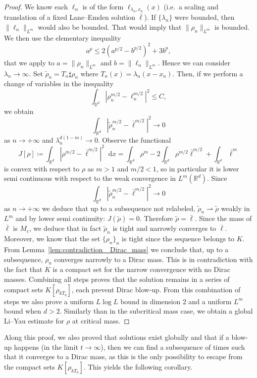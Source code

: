 \documentclass[11pt,a4paper]{article}
\numberwithin{equation}{section}
\newcommand{\R}{{\mathbb{R}}}
\theoremstyle{plain}
\theoremstyle{remark}
\newcommand{\diff}{\mathop{}\!\mathrm{d}}
\begin{document}
\begin{proof}
We know each $\ell_n$ is of the form $\ell_{\lambda_n,x_n}(x)$ (i.e.\ a scaling and translation of a fixed Lane--Emden solution $\bar{\ell}$).  If $\{\lambda_n\}$ were bounded, then $\|\ell_n\|_{L^m}$ would also be bounded. That would imply that $\|\rho_n\|_{L^{m}}$ is bounded. We then use the elementary inequality 
$$
    a^p\le 2(a^{p/2}-b^{p/2})^2 + 3 b^p,
$$
that we apply to $a=\|\rho_n\|_{L^{m}}$ and $b=\| \ell_n\|_{L^{m}}$.  Hence we can consider $\lambda_n\to\infty$. Set $\tilde{\rho}_n= T_n\sharp \rho_n$ where $T_n(x)=\lambda_n(x-x_n)$. Then, if we perform a change of variables in the inequality
$$
    \int_{\R^d}|\rho_n^{m/2}-\ell_n^{m/2}|^2\le C, 
$$
we obtain
$$
    \int_{\R^d}|\tilde{\rho}_n^{m/2}-\bar{\ell}^{m/2}|^2\to  0 
$$
as $n\to+\infty$ and $\lambda_n^{d(1-m)}\to 0$. Observe the functional 
$$
    J[\rho]\coloneqq \int_{\R^d}|\rho^{m/2}-\bar{\ell}^{m/2}|^2\diff x = \int_{\R^d}\rho^m- 2\int_{\R^d}\rho^{m/2}\bar{\ell}^{m/2}+\int_{\R^d}\bar{\ell}^{m} 
$$
is convex with respect to $\rho$ as $m>1$ and $m/2 < 1$, so in particular it is lower semi continuous with respect to the weak convergence in $L^m(\R^d)$. Since $$
\int_{\R^d}|\tilde{\rho}_n^{m/2}-\bar{\ell}^{m/2}|^2\to  0 
$$
as $n\to+\infty$ we deduce that up to a subsequence not relabeled, $\tilde{\rho}_n\rightharpoonup\tilde{\rho}$ weakly in $L^m$ and by lower semi continuity:
$J(\tilde{\rho})=0$. Therefore $\tilde{\rho}=\bar{\ell}$. Since the mass of $\bar{\ell}$ is $M_c$, we deduce that in fact $\tilde{\rho}_n$ is tight and narrowly converges to $\bar{\ell}$. Moreover, we know that the set $\{\rho_n\}_n$ is tight since the sequence belongs to $K$. From Lemma~\ref{lem:contradiction_ Dirac_mass} we conclude that, up to a subsequence, $\rho_{n}$ converges narrowly  to a  Dirac mass. This is in contradiction with the fact that $K$ is a compact set for the narrow convergence with no  Dirac masses. 
Combining all steps proves that the solution remains in a series of compact sets $K[\rho_{kT_0}]$, each prevent Dirac blow-up. From this combination of steps we also prove a uniform $L\log L$ bound in dimension $2$ and a uniform $L^m$ bound when $d>2$. Similarly than in the subcritical mass case, we obtain a global Li--Yau estimate for $\rho$ at critical mass. 
\end{proof}


\iffalse
Along this proof, we also proved that solutions exist globally and that if a blow-up happens (in the limit $t\to\infty$), then we can find a subsequence of times such that it converges to a  Dirac mass, as this is the only possibility to escape from the compact sets $K[\rho_{kT_0}]$. This yields the following corollary.
\end{document}
